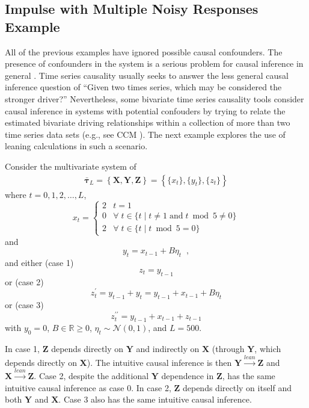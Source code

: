 \documentclass[twocolumn,aps,pre,groupedaddress]{revtex4-1}
\begin{document}
\subsection{Impulse with Multiple Noisy Responses Example}

All of the previous examples have ignored possible causal confounders.  The presence of confounders in the system is a serious problem for causal inference in general \cite{Rubin2015,Pearl2000}.  Time series causality usually seeks to answer the less general causal inference question of ``Given two times series, which may be considered the stronger driver?'' Nevertheless, some bivariate time series causality tools consider causal inference in systems with potential confouders by trying to relate the estimated bivariate driving relationships within a collection of more than two time series data sets (e.g., see CCM \cite{Sugihara2012}).  The next example explores the use of leaning calculations in such a scenario.

Consider the multivariate system of
\begin{eqnarray}
\label{eqn:3var}
\bar{\mathbf{\tau}}_L = \left\{\mathbf{X},\mathbf{Y},\mathbf{Z}\right\} = \left\{\{x_t\},\{y_t\},\{z_t\}\right\}
\end{eqnarray}
where $t=0,1,2,\ldots,L$,
\begin{equation*}
x_t = \left\{
  \begin{array}{lr}
    2 & t = 1\\
    0 & \forall\; t\in\{t\;|\;t\neq 1 \;\mathrm{and}\; t\bmod 5 \neq 0\}\\
    2 & \forall\; t\in\{t\;|\;t\bmod 5 = 0\}
  \end{array}
\right.
\end{equation*}
and
\begin{equation*}
y_t = x_{t-1} + B\eta_t\;\;,
\end{equation*}
and either (case 1)
\begin{equation}
z_t = y_{t-1}
\end{equation}
or (case 2)
\begin{equation}
z_t^\prime = y_{t-1} + y_t = y_{t-1} + x_{t-1} + B\eta_t
\end{equation}
or (case 3)
\begin{equation}
z_t^{\prime\prime} = y_{t-1} + x_{t-1} + z_{t-1}
\end{equation}
with $y_0 = 0$, $B\in\mathbb{R}\ge 0$, $\eta_t\sim\mathcal{N}\left(0,1\right)$, and $L=500$.

In case 1, $\mathbf{Z}$ depends directly on $\mathbf{Y}$ and indirectly on $\mathbf{X}$ (through $\mathbf{Y}$, which depends directly on $\mathbf{X}$).  The intuitive causal inference is then $\mathbf{Y}\xrightarrow{lean}\mathbf{Z}$ and $\mathbf{X}\xrightarrow{lean}\mathbf{Z}$.  Case 2, despite the additional $\mathbf{Y}$ dependence in $\mathbf{Z}$, has the same intuitive causal inference as case 0.  In case 2, $\mathbf{Z}$ depends directly on itself and both $\mathbf{Y}$ and $\mathbf{X}$.  Case 3 also has the same intuitive causal inference.
\end{document}
